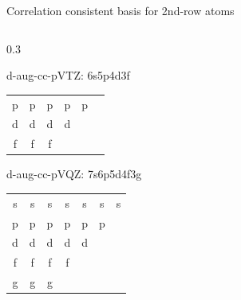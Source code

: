\documentclass[aspectratio=169,9pt]{beamer}
\newcommand{\purple}[1]{\textcolor{hfPurple}{#1}}
\newcommand{\red}[1]{\textcolor{hfRed}{#1}}
\newcommand{\green}[1]{\textcolor{hfGreen}{#1}}
\newcommand{\blue}[1]{\textcolor{hfBlue}{#1}}
\newcommand{\violet}[1]{\textcolor{hfViolet}{#1}}
\begin{document}
\begin{frame}{Correlation consistent basis for 2nd-row atoms}
\begin{columns}
\begin{column}{0.3\textwidth}
\begin{block}{\purple{d}-\red{aug}-cc-pVTZ: \small 6s5p4d3f}
\begin{tabular}{cccccc}
        			\green{p} & \green{p} & \blue{p} & \red{p} & \purple{p} \\
        			\green{d} & \blue{d} & \red{d} & \purple{d} \\
        			\blue{f} & \red{f} & \purple{f}  \\
        		\end{tabular}
        	\end{block}
        	\begin{block}{\purple{d}-\red{aug}-cc-pVQZ: \small 7s6p5d4f3g}
        		\begin{tabular}{ccccccc}
        			\green{s} & \green{s} & \green{s} & \blue{s} & \violet{s} & \red{s} & \purple{s} \\
        			\green{p} & \green{p} & \blue{p} & \violet{p} & \red{p} & \purple{p} \\
        			\green{d} & \blue{d} & \violet{d} & \red{d} & \purple{d} \\
        			\blue{f} & \violet{f} & \red{f} & \purple{f} \\
        			\violet{g} & \red{g} & \purple{g} \\
        		\end{tabular}
        	\end{block}
		\end{column}
	\end{columns}
\end{frame}
\end{document}

